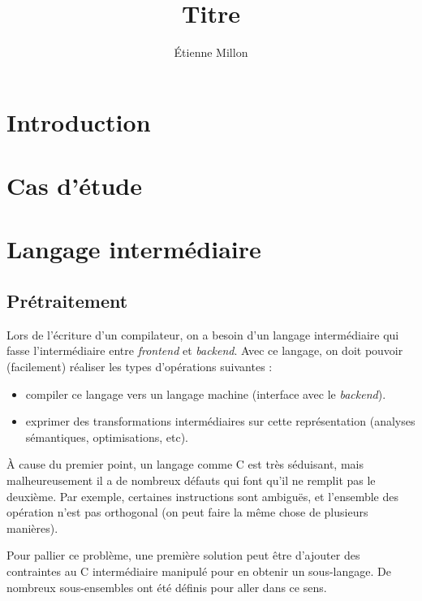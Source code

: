\documentclass{phdthesis}
\title{Titre}
\author{Étienne Millon}
\begin{document}
\maketitle

\tableofcontents

\chapter{Introduction}

\chapter{Cas d'étude}





\chapter{Langage intermédiaire}

\section{Prétraitement}

Lors de l'écriture d'un compilateur, on a besoin d'un langage
intermédiaire qui fasse l'intermédiaire entre \emph{frontend} et
\emph{backend}. Avec ce langage, on doit pouvoir (facilement) réaliser
les types d'opérations suivantes :

\begin{itemize}
\item
  compiler ce langage vers un langage machine (interface avec le
  \emph{backend}).
\item
  exprimer des transformations intermédiaires sur cette représentation
  (analyses sémantiques, optimisations, etc).
\end{itemize}
À cause du premier point, un langage comme C est très séduisant, mais
malheureusement il a de nombreux défauts qui font qu'il ne remplit pas
le deuxième. Par exemple, certaines instructions sont ambiguës, et
l'ensemble des opération n'est pas orthogonal (on peut faire la même
chose de plusieurs manières).

Pour pallier ce problème, une première solution peut être d'ajouter des
contraintes au C intermédiaire manipulé pour en obtenir un sous-langage.
De nombreux sous-ensembles ont été définis pour aller dans ce sens.
\end{document}
